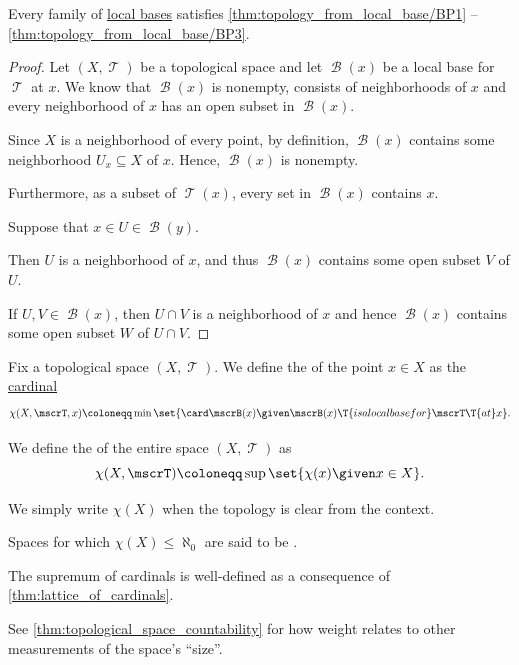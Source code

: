 \begin{proposition}\label{thm:local_base_can_generate_topology}
  Every family of \hyperref[def:topological_local_base]{local bases} satisfies \ref{thm:topology_from_local_base/BP1} -- \ref{thm:topology_from_local_base/BP3}.
\end{proposition}
\begin{proof}
  Let \( (X, \mscrT) \) be a topological space and let \( \mscrB(x) \) be a local base for \( \mscrT \) at \( x \). We know that \( \mscrB(x) \) is nonempty, consists of neighborhoods of \( x \) and every neighborhood of \( x \) has an open subset in \( \mscrB(x) \).

   Since \( X \) is a neighborhood of every point, by definition, \( \mscrB(x) \) contains some neighborhood \( U_x \subseteq X \) of \( x \). Hence, \( \mscrB(x) \) is nonempty.

  Furthermore, as a subset of \( \mscrT(x) \), every set in \( \mscrB(x) \) contains \( x \).

   Suppose that \( x \in U \in \mscrB(y) \).

  Then \( U \) is a neighborhood of \( x \), and thus \( \mscrB(x) \) contains some open subset \( V \) of \( U \).

   If \( U, V \in \mscrB(x) \), then \( U \cap V \) is a neighborhood of \( x \) and hence \( \mscrB(x) \) contains some open subset \( W \) of \( U \cap V \).
\end{proof}

\begin{definition}\label{def:topological_space_character}
  Fix a topological space \( (X, \mscrT) \). We define the  of the point \( x \in X \) as the \hyperref[def:cardinal]{cardinal}
  \begin{equation*}
    \chi(X, \mscrT, x) \coloneqq \min \set{ \card \mscrB(x) \given \mscrB(x) \T{is a local base for} \mscrT \T{at} x }.
  \end{equation*}

  We define the  of the entire space \( (X, \mscrT) \) as
  \begin{equation*}
    \chi(X, \mscrT) \coloneqq \sup \set{ \chi(x) \given x \in X }.
  \end{equation*}

  We simply write \( \chi(X) \) when the topology is clear from the context.

  Spaces for which \( \chi(X) \leq \hyperref[def:aleph_hierarchy]{\aleph_0} \) are said to be .
\end{definition}
\begin{comments}
  \item The supremum of cardinals is well-defined as a consequence of \cref{thm:lattice_of_cardinals}.
  \item See \cref{thm:topological_space_countability} for how weight relates to other measurements of the space's \enquote{size}.
\end{comments}

